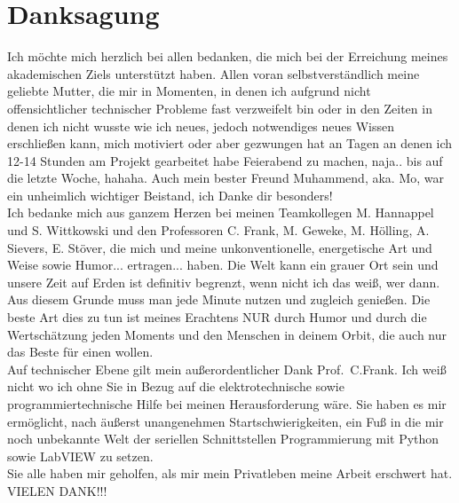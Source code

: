\section*{Danksagung}

\thispagestyle{empty}

Ich möchte mich herzlich bei allen bedanken, die mich bei der Erreichung meines akademischen Ziels unterstützt haben. Allen voran selbstverständlich meine geliebte Mutter, die mir in Momenten, in denen ich aufgrund nicht offensichtlicher technischer Probleme fast verzweifelt bin oder in den Zeiten in denen ich nicht wusste wie ich neues, jedoch notwendiges neues Wissen erschließen kann, mich motiviert oder aber gezwungen hat an Tagen an denen ich 12-14 Stunden am Projekt gearbeitet habe Feierabend zu machen, naja.. bis auf die letzte Woche, hahaha. Auch mein bester Freund {\Hypatia Muhammend}, aka. {\Hypatia Mo}, war ein unheimlich wichtiger Beistand, ich Danke dir besonders!\\

Ich bedanke mich aus ganzem Herzen bei meinen Teamkollegen {\Hypatia M. Hannappel} und {\Hypatia S. Wittkowski} und den Professoren {\Hypatia C. Frank, M. Geweke, M. Hölling, A. Sievers, E. Stöver,}  die mich und meine unkonventionelle, energetische Art und Weise sowie Humor... \glqq  ertragen\grqq{}... haben. Die Welt kann ein grauer Ort sein und unsere Zeit auf Erden ist definitiv begrenzt, wenn nicht ich das weiß, wer dann. Aus diesem Grunde muss man jede Minute nutzen und zugleich genießen. Die beste Art dies zu tun ist meines Erachtens NUR durch Humor und durch die Wertschätzung jeden Moments und den Menschen in deinem Orbit, die auch nur das Beste für einen wollen.\\

Auf technischer Ebene gilt mein außerordentlicher Dank Prof. \,{\Menlo C.Frank}. Ich weiß nicht wo ich ohne Sie in Bezug auf die elektrotechnische sowie programmiertechnische Hilfe bei meinen Herausforderung wäre. Sie haben es mir ermöglicht, nach äußerst unangenehmen Startschwierigkeiten, ein Fuß in die mir noch unbekannte Welt der seriellen Schnittstellen Programmierung mit Python sowie LabVIEW zu setzen.\\

Sie alle haben mir geholfen, als mir mein Privatleben meine Arbeit erschwert hat.\\

VIELEN DANK!!!
\vspace{3em}


\pagebreak